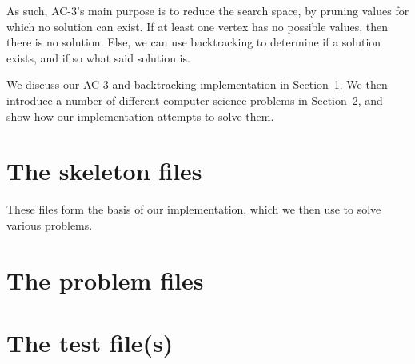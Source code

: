 \documentclass[12pt,a4paper]{article}
\begin{document}
As such, AC-3's main purpose is to reduce the search space, by pruning values for which no
 solution can exist. If at least one vertex has no possible values, then there is no solution.
Else, we can use backtracking to determine if a solution exists, and if so what said solution is.

We discuss our AC-3 and backtracking implementation in Section~\ref{sec:skeleton}. 
We then introduce a number of different computer science problems in Section~\ref{sec:problems}, and show how our implementation
attempts to solve them. 

\section{The skeleton files}\label{sec:skeleton}
These files form the basis of our implementation, which we then use to solve various problems.





\section{The problem files}\label{sec:problems} %












\section{The test file(s)}







\end{document}
